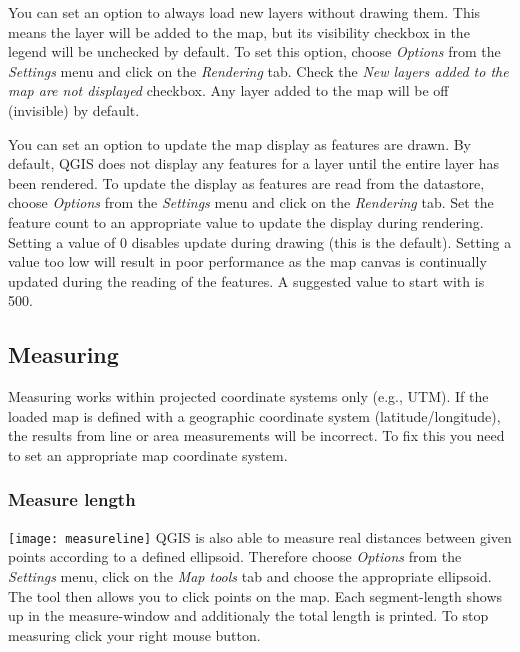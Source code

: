 You can set an option to always load new layers without drawing them. This
means the layer will be added to the map, but its visibility checkbox in the
legend will be unchecked by default. To set this option, choose
\textit{Options} from the \textit{Settings} menu and click on the
\textit{Rendering} tab. Check the \textit{New layers added to the map are not
displayed} checkbox. Any layer added to the map will be off (invisible) by
default.

%
%

\label{label_updatemap}

You can set an option to update the map display as features are drawn. By
default, QGIS does not display any features for a layer until the entire
layer has been rendered. To update the display as features are read from the
datastore, choose \textit{Options} from the \textit{Settings} menu and
click on the \textit{Rendering} tab. Set the feature count to an
appropriate value to update the display during rendering. Setting a value of 0
disables update during drawing (this is the default). Setting a value too low
will result in poor performance as the map canvas is continually updated
during the reading of the features. A suggested value to start with is 500. 

\subsection{Measuring}\label{sec:measure}

Measuring works within projected coordinate systems only (e.g., UTM). If 
the loaded map is defined with a geographic coordinate system
(latitude/longitude), the results from line or area measurements will be 
incorrect. To fix this you need to set an appropriate map coordinate system.

\subsubsection{Measure length}
\texttt{[image: measureline]} QGIS is also able to measure real distances between given 
points according to a defined ellipsoid. Therefore choose \textit{Options} from the \textit{Settings} menu, 
click on the \textit{Map tools} tab and choose the appropriate ellipsoid. The tool then allows you to 
click points on the map. Each segment-length shows up in the measure-window and additionaly the total 
length is printed. To stop measuring click your right mouse button. 

